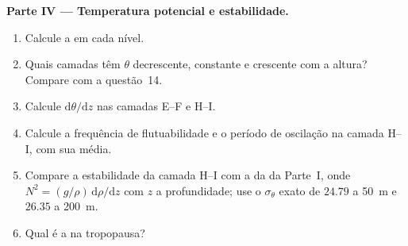 \begin{problem}
\medskip
\noindent\textbf{Parte IV --- Temperatura potencial e estabilidade.}
\begin{enumerate}[resume]
  \item Calcule a  em cada nível.
  \item Quais camadas têm $\theta$ decrescente, constante e crescente com a altura? Compare com a
        questão~14.
  \item Calcule $\mathrm d\theta/\mathrm dz$ nas camadas E--F e H--I.
  \item Calcule a frequência de flutuabilidade e o período de oscilação na camada H--I, com sua
         média.
  \item Compare a estabilidade da camada H--I com a da  da Parte~I, onde $N^2 = (g/\rho)\,\mathrm d\rho/\mathrm dz$ com $z$ a profundidade; use o $\sigma_\theta$ exato de
        $24.79$ a \qty{50}{m} e $26.35$ a \qty{200}{m}.
  \item Qual é a  na tropopausa?
\end{enumerate}
\end{problem}
